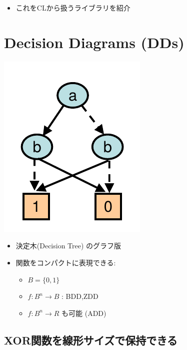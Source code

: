 \begin{itemize}
\item これをCLから扱うライブラリを紹介
\end{itemize}

\section{Decision Diagrams (DDs)}
\label{sec-4}

\begin{container-fluid}
\begin{row-fluid}
\begin{span6}
\includegraphics{img/static/dd.png}
\end{span6}
\begin{span6}
\begin{itemize}
\item 決定木(Decision Tree) のグラフ版
\item 関数をコンパクトに表現できる:
\begin{itemize}
\item $B = \{0, 1\}$
\item $f: B^n \rightarrow B$ : BDD,ZDD
\item $f: B^n \rightarrow R$ も可能 (ADD)
\end{itemize}
\end{itemize}
\end{span6}
\end{row-fluid}
\end{container-fluid}

\subsection{XOR関数を線形サイズで保持できる}
\label{sec-4-1}

